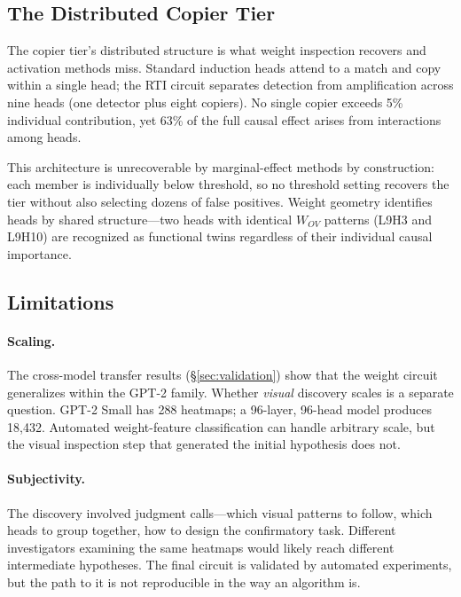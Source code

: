 \documentclass{article}
\begin{document}
\subsection{The Distributed Copier Tier}

The copier tier's distributed structure is what weight inspection
recovers and activation methods miss. Standard induction heads attend to
a match and copy within a single head; the RTI circuit separates
detection from amplification across nine heads (one detector plus eight
copiers). No single copier exceeds 5\% individual contribution, yet 63\%
of the full causal effect arises from interactions among heads.

This architecture is unrecoverable by marginal-effect methods by
construction: each member is individually below threshold, so no
threshold setting recovers the tier without also selecting dozens of
false positives. Weight geometry identifies heads by shared
structure---two heads with identical $W_{OV}$ patterns (L9H3 and
L9H10) are recognized as functional twins regardless of their
individual causal importance.

\subsection{Limitations}

\paragraph{Scaling.}
The cross-model transfer results (\S\ref{sec:validation}) show that
the weight circuit generalizes within the GPT-2 family. Whether
\emph{visual} discovery scales is a separate question. GPT-2 Small has
288 heatmaps; a 96-layer, 96-head model produces 18,432. Automated
weight-feature classification can handle arbitrary scale, but the
visual inspection step that generated the initial hypothesis does not.

\paragraph{Subjectivity.}
The discovery involved judgment calls---which visual patterns to follow,
which heads to group together, how to design the confirmatory task.
Different investigators examining the same heatmaps would likely
reach different intermediate hypotheses. The final circuit is validated
by automated experiments, but the path to it is not reproducible in the
way an algorithm is.
\end{document}

